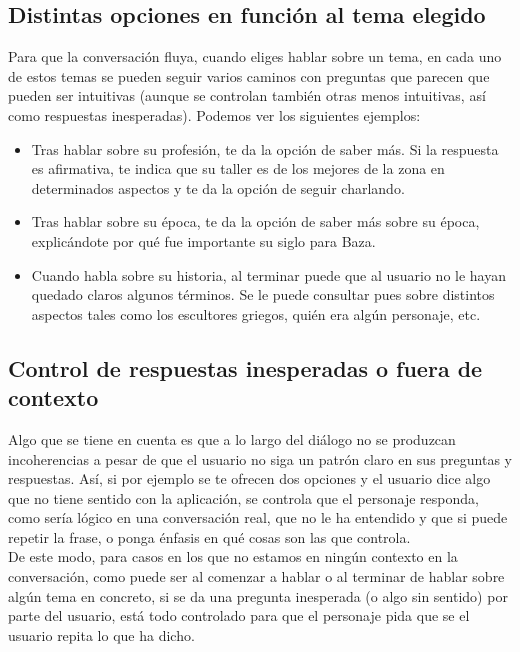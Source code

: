 \documentclass{article}
\begin{document}
\subsection*{Distintas opciones en función al tema elegido}

Para que la conversación fluya, cuando eliges hablar sobre un tema, en cada uno de estos temas se pueden seguir varios caminos con preguntas que parecen que pueden ser intuitivas (aunque se controlan también otras menos intuitivas, así como respuestas inesperadas). Podemos ver los siguientes ejemplos:

\begin{itemize}
	\item Tras hablar sobre su profesión, te da la opción de saber más. Si la respuesta es afirmativa, te indica que su taller es de los mejores de la zona en determinados aspectos y te da la opción de seguir charlando.
	
	\item Tras hablar sobre su época, te da la opción de saber más sobre su época, explicándote por qué fue importante su siglo para Baza.
	
	\item Cuando habla sobre su historia, al terminar puede que al usuario no le hayan quedado claros algunos términos. Se le puede consultar pues sobre distintos aspectos tales como los escultores griegos, quién era algún personaje, etc.
	
\end{itemize}

\subsection*{Control de respuestas inesperadas o fuera de contexto}

Algo que se tiene en cuenta es que a lo largo del diálogo no se produzcan incoherencias a pesar de que el usuario no siga un patrón claro en sus preguntas y respuestas. Así, si por ejemplo se te ofrecen dos opciones y el usuario dice algo que no tiene sentido con la aplicación, se controla que el personaje responda, como sería lógico en una conversación real, que no le ha entendido y que si puede repetir la frase, o ponga énfasis en qué cosas son las que controla.\\ 

De este modo, para casos en los que no estamos en ningún contexto en la conversación, como puede ser al comenzar a hablar o al terminar de hablar sobre algún tema en concreto, si se da una pregunta inesperada (o algo sin sentido) por parte del usuario, está todo controlado para que el personaje pida que se el usuario repita lo que ha dicho. \\
\end{document}
